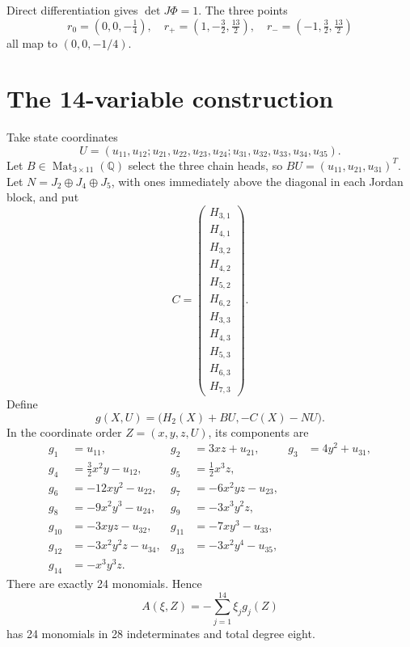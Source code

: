 \documentclass[11pt]{article}
\newcommand{\Q}{\mathbb Q}
\begin{document}
Direct differentiation gives $\det J\Phi=1$.  The three points
\begin{equation}
 r_0=(0,0,-\tfrac14),\quad
 r_+=(1,-\tfrac32,\tfrac{13}2),\quad
 r_-=(-1,\tfrac32,\tfrac{13}2) \label{eq:sourcepoints}
\end{equation}
all map to $(0,0,-1/4)$.

\section{The 14-variable construction}

Take state coordinates
\[
 U=(u_{11},u_{12};u_{21},u_{22},u_{23},u_{24};
 u_{31},u_{32},u_{33},u_{34},u_{35}).
\]
Let $B\in\operatorname{Mat}_{3\times11}(\Q)$ select the three chain heads,
so $BU=(u_{11},u_{21},u_{31})^T$.  Let
$N=J_2\oplus J_4\oplus J_5$, with ones immediately above the diagonal in
each Jordan block, and put
\[
C=\begin{pmatrix}
H_{3,1}\\H_{4,1}\\
H_{3,2}\\H_{4,2}\\H_{5,2}\\H_{6,2}\\
H_{3,3}\\H_{4,3}\\H_{5,3}\\H_{6,3}\\H_{7,3}
\end{pmatrix}.
\]
Define
\begin{equation}
 g(X,U)=\bigl(H_2(X)+BU,-C(X)-NU\bigr). \label{eq:blockg}
\end{equation}
In the coordinate order $Z=(x,y,z,U)$, its components are
\begingroup\small
\begin{align}
g_1&=u_{11},&
g_2&=3xz+u_{21},&
g_3&=4y^2+u_{31},\nonumber\\
g_4&=\tfrac32x^2y-u_{12},&
g_5&=\tfrac12x^3z,\nonumber\\
g_6&=-12xy^2-u_{22},&
g_7&=-6x^2yz-u_{23},\nonumber\\
g_8&=-9x^2y^3-u_{24},&
g_9&=-3x^3y^2z,\nonumber\\
g_{10}&=-3xyz-u_{32},&
g_{11}&=-7xy^3-u_{33},\nonumber\\
g_{12}&=-3x^2y^2z-u_{34},&
g_{13}&=-3x^2y^4-u_{35},\nonumber\\
g_{14}&=-x^3y^3z. \label{eq:gdisplay}
\end{align}
\endgroup
There are exactly 24 monomials.  Hence
\begin{equation}
 A(\xi,Z)=-\sum_{j=1}^{14}\xi_jg_j(Z) \label{eq:A}
\end{equation}
has 24 monomials in 28 indeterminates and total degree eight.
\end{document}
